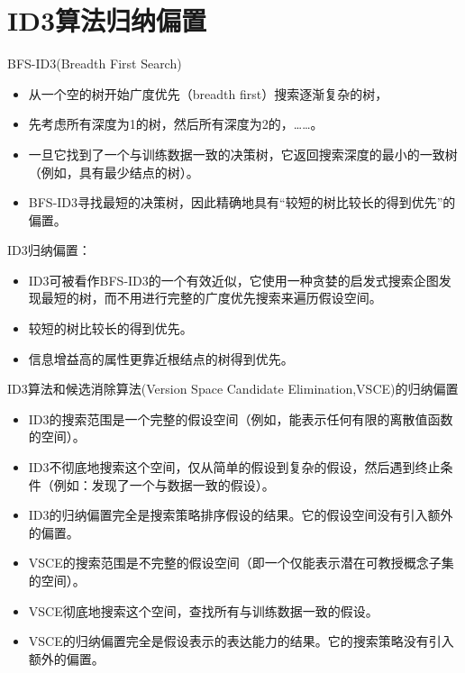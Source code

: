 \documentclass[presentation]{beamer}
\begin{document}
\section{ID3算法归纳偏置}
\label{sec:orgdb3338d}

\begin{frame}[label={sec:org54e9f3f}]{BFS-ID3(Breadth First Search)}
\begin{itemize}
\item 从一个空的树开始广度优先（breadth first）搜索逐渐复杂的树，
\item 先考虑所有深度为1的树，然后所有深度为2的，……。
\item 一旦它找到了一个与训练数据一致的决策树，它返回搜索深度的最小的一致树（例如，具有最少结点的树）。
\item BFS-ID3寻找最短的决策树，因此精确地具有“较短的树比较长的得到优先”的偏置。
\end{itemize}
\end{frame}

\begin{frame}[label={sec:org941c146}]{ID3归纳偏置：}
\begin{itemize}
\item ID3可被看作BFS-ID3的一个有效近似，它使用一种贪婪的启发式搜索企图发现最短的树，而不用进行完整的广度优先搜索来遍历假设空间。
\item 较短的树比较长的得到优先。
\item 信息增益高的属性更靠近根结点的树得到优先。
\end{itemize}
\end{frame}

\begin{frame}[label={sec:org66a3459}]{ID3算法和候选消除算法(Version Space Candidate Elimination,VSCE)的归纳偏置}
\begin{itemize}
\item ID3的搜索范围是一个完整的假设空间（例如，能表示任何有限的离散值函数的空间）。
\item ID3不彻底地搜索这个空间，仅从简单的假设到复杂的假设，然后遇到终止条件（例如：发现了一个与数据一致的假设）。
\item ID3的归纳偏置完全是搜索策略排序假设的结果。它的假设空间没有引入额外的偏置。
\item VSCE的搜索范围是不完整的假设空间（即一个仅能表示潜在可教授概念子集的空间）。
\item VSCE彻底地搜索这个空间，查找所有与训练数据一致的假设。
\item VSCE的归纳偏置完全是假设表示的表达能力的结果。它的搜索策略没有引入额外的偏置。
\end{itemize}
\end{frame}
\end{document}
